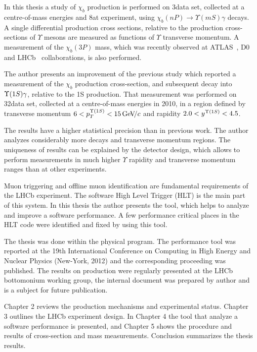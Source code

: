 In this thesis a study of $\chi_b$ production is performed on 3\invfb data set,
collected at a centre-of-mass energies  and 8\tev at \lhcb experiment,
using $\chi_b(nP)\rightarrow\Upsilon(mS)\gamma$ decays. A single differential
production cross sections, relative to the production cross-sections of
$\Upsilon$ mesons are measured as functions of $\Upsilon$ transverse momentum.
A measurement of the $\chi_b(3P)$ mass, which was recently observed at
ATLAS~\cite{Aad:2011ih}, D0~\cite{Abazov:2012gh} and
LHCb~\cite{LHCb-CONF-2012-020} collaborations, is also performed.

The author presents an improvement of the previous \lhcb
study\cite{LHCb-PAPER-2012-015} which reported a measurement of the $\chi_b$
production cross-section, and subsequent decay into $\Y1S \gamma$, relative
to the \Y1S production. That measurement was performed on 32\invpb data set,
collected at a centre-of-mass energies  in 2010,  in a region defined by
transverse momentum $6  < p_{T}^{\Y1S} < 15 \gevc$ and rapidity  $2.0 <
y^{\Y1S} < 4.5$. 

The results have a higher statistical precision than in previous work. The
author analyzes considerably more decays and transverse momentum regions. The
uniqueness of results can be explained by the \lhcb detector design, which
allows to perform measurements in much higher $\Upsilon$ rapidity and
transverse momentum ranges than at other experiments.

Muon triggering and offline muon identification are fundamental requirements of
the LHCb experiment. The software High Level Trigger (HLT) is the main part of
this system. In this thesis the author presents the tool, which helps to
analyze and improve a software performance. A few performance critical places
in the HLT code were identified and fixed by using this tool.

The thesis was done within the \lhcb physical program. The 
performance tool was reported at the 19th International
Conference on Computing in High Energy and Nuclear Physics (New-York, 2012) and
the corresponding proceeding was published\cite{aprofiler}. The results on
\chib production were regularly presented at the LHCb bottomonium working group,
the internal document was prepared by author and is a subject for future
publication.

Chapter 2 reviews the production mechanisms and experimental status. Chapter 3
outlines the LHCb experiment design. In Chapter 4 the tool that analyze a
software performance is presented, and Chapter 5 shows the procedure and
results of cross-section and \chibThreeP mass measurements. Conclusion
summarizes the thesis results.
